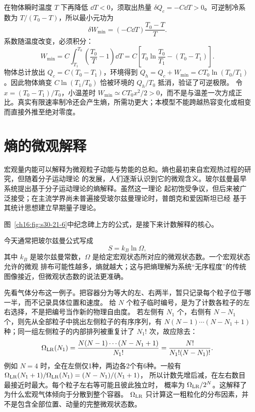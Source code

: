 {\begin{xesolution}
在物体瞬时温度 $T$ 下再降低 $\dd T<0$，须取出热量 $\delta Q_c=-C\dd T>0$。可逆制冷系数为 $T/(T_0-T)$，所以最小元功为
\[
 \delta W_{\min}=(-C\dd T)\frac{T_0-T}{T}.
\]
系数随温度改变，必须积分：
\[
 W_{\min}=C\int_{T_1}^{T_0}\left(\frac{T_0}{T}-1\right)\dd T
 =C\left[T_0\ln\frac{T_0}{T_1}-(T_0-T_1)\right].
\]
物体总计放出 $Q_c=C(T_0-T_1)$，环境得到 $Q_h=Q_c+W_{\min}=CT_0\ln(T_0/T_1)$。因此物体熵变 $C\ln(T_1/T_0)$ 恰被环境的 $Q_h/T_0$ 抵消，验证了可逆极限。
令 $x=(T_0-T_1)/T_0$，小温差时 $W_{\min}\simeq CT_0x^2/2>0$，而不是与温差一次方成正比。真实有限速率制冷还会产生熵，所需功更大；本模型不能跨越热容变化或相变而直接外推至绝对零度。
\end{xesolution}

\section{熵的微观解释}

宏观量内能可以解释为微观粒子动能与势能的总和。熵也最初来自宏观热过程的研究，但随着分子运动理论
的发展，人们逐渐认识到它的微观含义。玻尔兹曼最早系统提出基于分子运动理论的熵解释。虽然这一理论
起初饱受争议，但后来被广泛接受；在主流学界尚未普遍接受玻尔兹曼理论时，普朗克和爱因斯坦已经
基于其统计思想建立早期量子理论。

\par\noindent\begin{minipage}{\linewidth}
\boltzmannMemorialFigure
{}\label{ch16:fig:s30-21-6}
\end{minipage}\par\medskip
图~\ref{ch16:fig:s30-21-6}中纪念碑上方的公式，是接下来计数解释的核心。

今天通常把玻尔兹曼公式写成
\begin{equation}
  \boxed{S=k_B\ln\Omega},
\end{equation}
其中 $k_B$ 是玻尔兹曼常数，$\Omega$ 是给定宏观状态所对应的微观状态数。一个宏观状态允许的微观
排布可能性越多，熵就越大；这与把熵理解为系统“无序程度”的传统图像接近，但微观状态数的说法更准确。

先看气体分布这一例子。把容器分为等大的左、右两半，暂只记录每个粒子位于哪一半，而不记录具体位置和速度。
给 $N$ 个粒子临时编号，是为了计数各粒子的左右选择，不是把编号当作新的物理自由度。
若左侧有 $N_1$ 个，右侧有 $N-N_1$ 个，则先从全部粒子中挑出左侧粒子的有序序列，有
$N(N-1)\cdots(N-N_1+1)$ 种；同一组左侧粒子的内部排列被重复计了 $N_1!$ 次，故应除去：
\[
 \Omega_{\rm LR}(N_1)=\frac{N(N-1)\cdots(N-N_1+1)}{N_1!}
 =\frac{N!}{N_1!(N-N_1)!}.
\]
例如 $N=4$ 时，全在左侧仅1种，两边各2个有6种。一般有
$\Omega_{\rm LR}(N_1+1)/\Omega_{\rm LR}(N_1)=(N-N_1)/(N_1+1)$，
所以计数先增后减，在左右数目最接近时最大。每个粒子左右等可能且彼此独立时，
概率为 $\Omega_{\rm LR}/2^N$。这解释了为什么宏观气体倾向于分散到整个容器。
$\Omega_{\rm LR}$ 只计算这一粗粒化的分布因素，并不是包含全部位置、动量的完整微观状态数。

}

